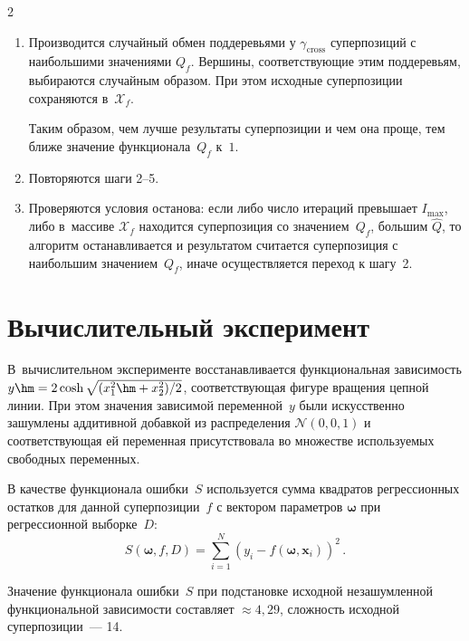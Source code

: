 \begin{multicols}{2}
\begin{enumerate}
 
  
  
  \item Производится случайный обмен поддеревьями у $\gamma_{\mathrm{cross}}$ суперпозиций
    с наибольшими значениями $Q_f$. Вершины, соответствующие этим поддеревьям,
    выбираются случайным образом. При этом исходные суперпозиции сохраняются
    в~$\mathcal{X}_f$.
    

Таким образом, чем лучше результаты суперпозиции и чем она проще, тем ближе
значение функционала~$Q_f$ к~$1$.


  \item Повторяются шаги 2--5.
  \item Проверяются условия останова: если либо чис\-ло итераций превышает
    $I_{\max}$, либо в~массиве $\mathcal{X}_f$ находится суперпозиция со значением~$Q_f$, 
    большим $\hat{Q}$, то алгоритм останавливается
    и результатом считается суперпозиция с наибольшим значением~$Q_f$, иначе
    осуществляется переход к шагу~2.
\end{enumerate}

\section{Вычислительный эксперимент}

В~вычислительном эксперименте вос\-ста\-нав\-ли\-ва\-ет\-ся функциональная зависимость
$y \hm= 2 \cosh \sqrt{(x_1^2\hm + x_2^2)/2}$, соответствующая фигуре вращения
цепной линии. При этом значения зависимой
переменной~$y$ были искусственно зашумлены аддитивной добавкой из
распределения $\mathcal{N} (0, 0{,}1)$ и соответствующая ей переменная
присутствовала во множестве используемых свободных переменных.

В качестве функционала ошибки~$S$ используется сумма квадратов
регрессионных остатков для данной суперпозиции~$f$ с вектором параметров
$\boldsymbol{\omega}$ при регрессионной выборке~$D$:
\begin{equation}
  \label{eq:sse_expr}
  S(\boldsymbol{\omega}, f, D) = \sum\limits_{i=1}^N (y_i - f (\boldsymbol{\omega}, 
  \mathbf{x}_i))^2\,.
\end{equation}

Значение функционала ошибки~$S$ при подстановке исходной незашумленной
функциональной зависимости составляет $\approx 4{,}29$, сложность исходной
суперпозиции~--- 14.

\begin{table}\small
\begin{center}
  \label{tabl:results}
  \vspace*{2ex}


\end{center}
\end{table}
\end{multicols}
